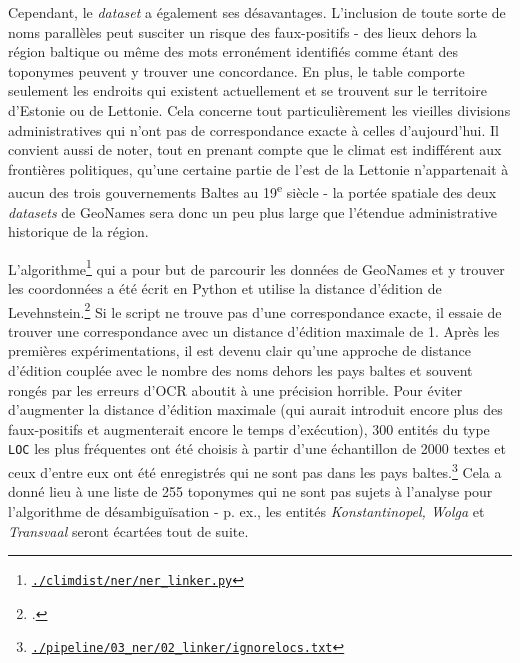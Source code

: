 \documentclass[a4paper,twoside,12pt]{article}
\begin{document}
Cependant, le \textit{dataset} a également ses désavantages. L'inclusion de toute sorte de noms parallèles peut susciter un risque des faux-positifs - des lieux dehors la région baltique ou même des mots erronément identifiés comme étant des toponymes peuvent y trouver une concordance. En plus, le table comporte seulement les endroits qui existent actuellement et se trouvent sur le territoire d'Estonie ou de Lettonie. Cela concerne tout particulièrement les vieilles divisions administratives qui n'ont pas de correspondance exacte à celles d'aujourd'hui. Il convient aussi de noter, tout en prenant compte que le climat est indifférent aux frontières politiques, qu'une certaine partie de l'est de la Lettonie n'appartenait à aucun des trois gouvernements Baltes au 19\textsuperscript{e} siècle - la portée spatiale des deux \textit{datasets} de GeoNames sera donc un peu plus large que l'étendue administrative historique de la région.

L'algorithme\footnote{\href{https://github.com/krkryger/clim-dist/blob/main/climdist/ner/ner_linker.py}{\texttt{./climdist/ner/ner\_linker.py}}} qui a pour but de parcourir les données de GeoNames et y trouver les coordonnées a été écrit en Python et utilise la distance d'édition de Levehnstein.\footcite[cf.][22-26]{jurafsky_speech_2020} Si le script ne trouve pas d'une correspondance exacte, il essaie de trouver une correspondance avec un distance d'édition maximale de 1. Après les premières expérimentations, il est devenu clair qu'une approche de distance d'édition couplée avec le nombre des noms dehors les pays baltes et souvent rongés par les erreurs d'OCR aboutit à une précision horrible. Pour éviter d'augmenter la distance d'édition maximale (qui aurait introduit encore plus des faux-positifs et augmenterait encore le temps d'exécution), 300 entités du type \texttt{LOC} les plus fréquentes ont été choisis à partir d'une échantillon de 2000 textes et ceux d'entre eux ont été enregistrés qui ne sont pas dans les pays baltes.\footnote{\href{https://github.com/krkryger/clim-dist/blob/main/pipeline/03_ner/02_linker/ignorelocs.txt}{\texttt{./pipeline/03\_ner/02\_linker/ignorelocs.txt}}} Cela a donné lieu à une liste de 255 toponymes qui ne sont pas sujets à l'analyse pour l'algorithme de désambiguïsation - p. ex., les entités \textit{Konstantinopel, Wolga} et \textit{Transvaal} seront écartées tout de suite.
\end{document}
